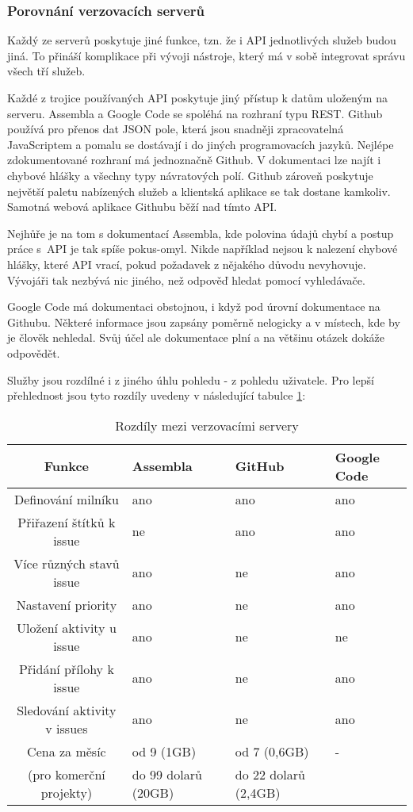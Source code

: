 \subsubsection{Porovnání verzovacích serverů}

Každý ze serverů poskytuje jiné funkce, tzn. že i API jednotlivých služeb budou jiná. To přináší komplikace při vývoji nástroje, který má v sobě integrovat správu všech tří služeb.

Každé z trojice používaných API poskytuje jiný přístup k datům uloženým na serveru. Assembla a Google Code se spoléhá na rozhraní typu REST\cite{rest}. Github používá pro přenos dat JSON\cite{json} pole, která jsou snadněji zpracovatelná JavaScriptem a pomalu se dostávají i do jiných programovacích jazyků. Nejlépe zdokumentované rozhraní má jednoznačně Github. V dokumentaci lze najít i chybové hlášky a všechny typy návratových polí. Github zároveň poskytuje největší paletu nabízených služeb a klientská aplikace se tak dostane kamkoliv. Samotná webová aplikace Githubu běží nad tímto API.

Nejhůře je na tom s dokumentací Assembla, kde polovina údajů chybí a postup práce s~API je tak spíše pokus-omyl. Nikde například nejsou k nalezení chybové hlášky, které API vrací, pokud požadavek z nějakého důvodu nevyhovuje. Vývojáři tak nezbývá nic jiného, než odpověď hledat pomocí vyhledávače.

Google Code má dokumentaci obstojnou, i když pod úrovní dokumentace na Githubu. Některé informace jsou zapsány poměrně nelogicky a v místech, kde by je člověk nehledal. Svůj účel ale dokumentace plní a na většinu otázek dokáže odpovědět.

Služby jsou rozdílné i z jiného úhlu pohledu - z pohledu uživatele. Pro lepší přehlednost jsou tyto rozdíly uvedeny v následující tabulce \ref{tab:versionSystemsDifference}:

\begin{table}
\begin{center}
	\begin{tabular}{|c||l|l|l|}
	\hline
	Funkce & Assembla & GitHub & Google Code \\
	\hline
	\hline
	Definování milníku & ano & ano & ano \\
	Přiřazení štítků k issue & ne & ano & ano \\
	Více různých stavů issue & ano & ne & ano \\
	Nastavení priority & ano & ne & ano \\
	Uložení aktivity u issue & ano & ne & ne \\
	Přidání přílohy k issue & ano & ne & ano \\
	Sledování aktivity v issues & ano & ne & ano \\
	\hline
	Cena za měsíc & od 9 (1GB) & od 7 (0,6GB) & - \\
	(pro komerční projekty) & do 99 dolarů (20GB) & do 22 dolarů (2,4GB) & \\
	\hline
	\end{tabular}
\end{center}
\caption{Rozdíly mezi verzovacími servery}
\label{tab:versionSystemsDifference}
\end{table}


